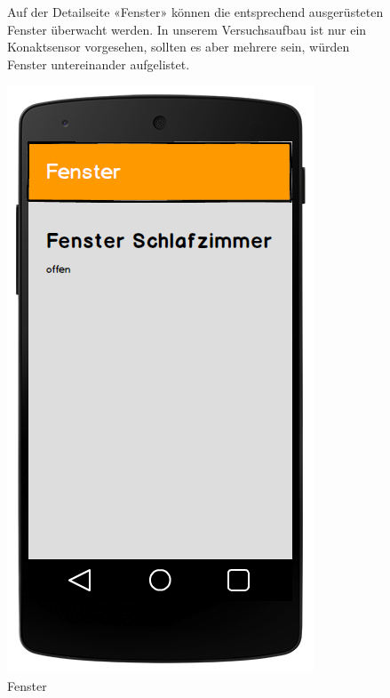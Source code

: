 \begin{figure}[htbp]
	\begin{minipage}{0.6\textwidth} 
Auf der Detailseite «Fenster» können die entsprechend ausgerüsteten Fenster überwacht werden. In unserem Versuchsaufbau ist nur ein Konaktsensor vorgesehen, sollten es aber mehrere sein, würden Fenster untereinander aufgelistet.
	\end{minipage}
	\hfill
	\begin{minipage}{0.32\textwidth}
		\includegraphics[width=\textwidth]{report/img/mockup_window.png}
		\caption{Fenster}
		\label{fig:mockupWindow}
	\end{minipage}
\end{figure}


